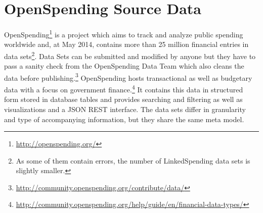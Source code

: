 \documentclass[sw]{iosart2x}
\begin{document}


\iffalse
2-3 beispiele

statistik darüber bringen

manuelles proof über die qualität

am ende die datacubes nehmen

data quality dashboard vom data cube nehmen
\fi


\section{OpenSpending Source Data}\label{sec:openspending}
OpenSpending\footnote{\url{http://openspending.org/}} is a project which aims to track and analyze public spending worldwide and, at May 2014, contains more than 25 million financial entries in \numberofopenspendingdatasets{} data sets\footnote{As some of them contain errors, the number of LinkedSpending data sets is slightly smaller.}.
Data Sets can be submitted and modified by anyone but they have to pass a sanity check from the OpenSpending Data Team which also cleans the data before publishing.\footnote{\url{http://community.openspending.org/contribute/data/}}
OpenSpending hosts transactional as well as budgetary data with a focus on government finance.\footnote{\url{http://community.openspending.org/help/guide/en/financial-data-types/}}
It contains this data in structured form stored in database tables and provides searching and filtering as well as visualizations and a JSON REST interface.
The data sets differ in granularity and type of accompanying information, but they share the same meta model.
\end{document}
